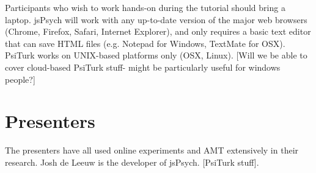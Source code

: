 \documentclass[10pt,letterpaper]{article}
\begin{document}
Participants who wish to work hands-on during the tutorial should bring a laptop. jsPsych will work with any up-to-date version of the major web browsers (Chrome, Firefox, Safari, Internet Explorer), and only requires a basic text editor that can save HTML files (e.g. Notepad for Windows, TextMate for OSX). PsiTurk works on UNIX-based platforms only (OSX, Linux). [Will we be able to cover cloud-based PsiTurk stuff- might be particularly useful for windows people?]

\section{Presenters}

The presenters have all used online experiments and AMT extensively in their research. Josh de Leeuw is the developer of jsPsych. [PsiTurk stuff].




\setlength{\bibleftmargin}{.125in}
\setlength{\bibindent}{-\bibleftmargin}


\end{document}
